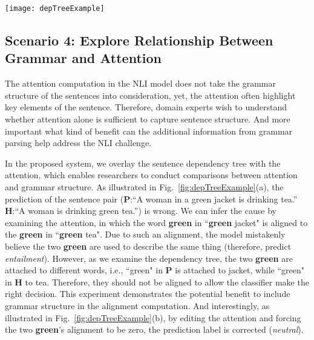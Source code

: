 %
\begin{figure*}[t]
\centering
\vspace{-2mm}
 \texttt{[image: depTreeExample]}
 \caption{
Dependency tree provides valuable information that can help fix the prediction error.
In (a), the model mistakenly aligns the word green, which lead to wrong prediction.  
After examining the dependency tree (highlighted by pink squares), we can see the two \textbf{green} are attached to different words.
In (b), by editing the attention and forcing the two \textbf{green}'s alignment to be zero, the prediction label is corrected to \emph{neutral}. 
 }
\label{fig:depTreeExample}
\end{figure*}

\subsection{Scenario 4: Explore Relationship Between Grammar and Attention}
The attention computation in the NLI model does not take the grammar structure of the sentences into consideration,
yet, the attention often highlight key elements of the sentence. 
Therefore, domain experts wish to understand whether attention alone is sufficient to capture sentence structure. 
And more important what kind of benefit can the additional information from grammar parsing help address the NLI challenge.

In the proposed system, we overlay the sentence dependency tree with the attention, which enables researchers to conduct comparisons between attention and grammar structure.
As illustrated in Fig.~\ref{fig:depTreeExample}(a), the prediction of the sentence pair (\textbf{P}:``A woman in a green jacket is drinking tea.'' \textbf{H}:``A woman is drinking green tea.'') is wrong. We can infer the cause by examining the attention, in which the word \textbf{green} in ``\textbf{green} jacket" is aligned to the \textbf{green} in ``\textbf{green} tea". Due to such an alignment, the model mistakenly believe the two \textbf{green} are used to describe the same thing (therefore, predict \emph{entailment}).  However, as we examine the dependency tree, the two \textbf{green} are attached to different words, i.e., ``green" in \textbf{P} is attached to jacket, while ``green" in \textbf{H} to tea. Therefore, they should not be aligned to allow the classifier make the right decision.
%
This experiment demonstrates the potential benefit to include grammar structure in the alignment computation. %
%
And interestingly, as illustrated in Fig.~\ref{fig:depTreeExample}(b), by editing the attention and forcing the two \textbf{green}'s alignment to be zero, the prediction label is corrected (\emph{neutral}). 

